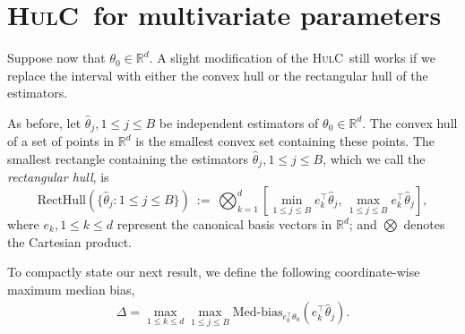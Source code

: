 \documentclass{article}
\newcommand{\hulc}{\textsc{HulC}~}
\numberwithin{myalgctr}{section}
\begin{document}
\section{\hulc for multivariate parameters}\label{subsec:multivariate}
Suppose now that
$\theta_0\in\mathbb{R}^d$.
A slight modification of the \hulc still works if we replace the interval
with either the convex hull
or the rectangular hull
of the estimators.

As before, let $\widehat{\theta}_j, 1\le j\le B$ be independent estimators of
$\theta_0\in\mathbb{R}^d$.
The convex hull of a set of points in $\mathbb{R}^d$ is
the smallest convex set containing these points. The smallest
rectangle containing the estimators $\widehat{\theta}_j, 1\le j\le B$,
which we call the \emph{rectangular hull},
is
\[
\mbox{RectHull}(\{\widehat{\theta}_j: 
1\le j\le B\}) ~:=~ \bigotimes_{k=1}^d 
\left[\min_{1\le j\le B}e_k^{\top}\widehat{\theta}_j,\,\max_{1\le j\le B}e_k^{\top}\widehat{\theta}_j\right],
\] 
where $e_k, 1\le k\le d$ represent the canonical basis vectors in
$\mathbb{R}^d$; and $\bigotimes$ denotes the Cartesian product. 

To compactly state our next result, we define the following coordinate-wise maximum median bias,
\begin{align}
\label{eq:coordinate-max-median-bias}
\Delta = \max_{1\le k\le d}\max_{1\le j\le B}\mbox{Med-bias}_{e_k^{\top}\theta_0}(e_k^{\top}\widehat{\theta}_j).
\end{align}
\end{document}
